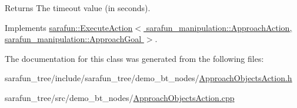 \begin{DoxyReturn}{Returns}
The timeout value (in seconds). 
\end{DoxyReturn}


Implements \hyperlink{classsarafun_1_1ExecuteAction_aba6cfa8a8ce19e735eb6394424df6d17}{sarafun\-::\-Execute\-Action$<$ sarafun\-\_\-manipulation\-::\-Approach\-Action, sarafun\-\_\-manipulation\-::\-Approach\-Goal $>$}.



The documentation for this class was generated from the following files\-:\begin{DoxyCompactItemize}
\item 
sarafun\-\_\-tree/include/sarafun\-\_\-tree/demo\-\_\-bt\-\_\-nodes/\hyperlink{ApproachObjectsAction_8h}{Approach\-Objects\-Action.\-h}\item 
sarafun\-\_\-tree/src/demo\-\_\-bt\-\_\-nodes/\hyperlink{ApproachObjectsAction_8cpp}{Approach\-Objects\-Action.\-cpp}\end{DoxyCompactItemize}
